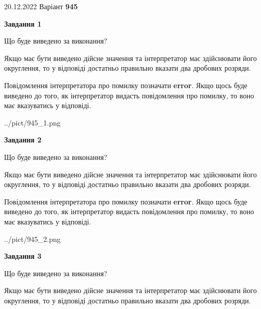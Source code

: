 \documentclass[12pt, ukrainian]{article}
\begin{document}
{20.12.2022 Варіант \No \textbf { 945 }\par}
{
\begin {Large}

{\begin {center}\textbf{Завдання 1}\end {center}}\par
Що буде виведено за виконання? \par

Якщо має бути виведено дійсне значення та інтерпретатор має здійснювати його округлення, 
то у відповіді достатньо правильно вказати два дробових розряди.

Повідомлення інтерпретатора про помилку позначати \textbf{error}.
Якщо щось буде виведено до того, як інтерпретатор видасть повідомлення про помилку, 
то воно має вказуватись у відповіді. \par

\begin{center}
	{../pict/945_1.png}
\end{center}
\newpage

{\begin {center}\textbf{Завдання 2}\end {center}}\par
Що буде виведено за виконання? \par

Якщо має бути виведено дійсне значення та інтерпретатор має здійснювати його округлення, 
то у відповіді достатньо правильно вказати два дробових розряди.

Повідомлення інтерпретатора про помилку позначати \textbf{error}.
Якщо щось буде виведено до того, як інтерпретатор видасть повідомлення про помилку, 
то воно має вказуватись у відповіді. \par

\begin{center}
	{../pict/945_2.png}
\end{center}
\newpage

{\begin {center}\textbf{Завдання 3}\end {center}}\par
Що буде виведено за виконання? \par

Якщо має бути виведено дійсне значення та інтерпретатор має здійснювати його округлення, 
то у відповіді достатньо правильно вказати два дробових розряди.


\end{Large}}
\end{document}
